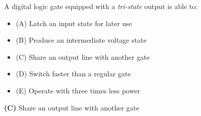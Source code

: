 


A digital logic gate equipped with a {\it tri-state} output is able to:

\begin{itemize}
\item{(A)} Latch an input state for later use
\vskip 5pt 
\item{(B)} Produce an intermediate voltage state
\vskip 5pt 
\item{(C)} Share an output line with another gate
\vskip 5pt 
\item{(D)} Switch faster than a regular gate
\vskip 5pt 
\item{(E)} Operate with three times less power
\end{itemize}







{\bf (C)} Share an output line with another gate
 










